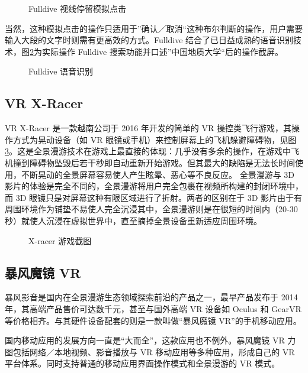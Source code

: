 \begin{figure}[htp]
\centering
{}
\caption{Fulldive 视线停留模拟点击}
\label{fig:fulldive3}
\end{figure}

当然，这种模拟点击的操作只适用于”确认／取消“这种布尔判断的操作，用户需要输入大段的文字时则需有更高效的方式。Fulldive 结合了已日益成熟的语音识别技术，图\ref{fig:fulldive4}为实际操作 Fulldive 搜索功能并口述”中国地质大学“后的操作截屏。

\begin{figure}[htp]
\centering
{}
\caption{Fulldive 语音识别}
\label{fig:fulldive4}
\end{figure}

\subsection{VR X-Racer}

VR X-Racer 是一款越南公司于 2016 年开发的简单的 VR 操控类飞行游戏，其操作方式为晃动设备（如 VR 眼镜或手机）来控制屏幕上的飞机躲避障碍物，见图\ref{fig:x-racer}。这是全景漫游技术在游戏上最直接的体现：几乎没有多余的操作，在游戏中飞机撞到障碍物坠毁后若干秒即自动重新开始游戏。但其最大的缺陷是无法长时间使用，不断晃动的全景屏幕容易使人产生眩晕、恶心等不良反应。
全景漫游与 3D 影片的体验是完全不同的，全景漫游将用户完全包裹在视频所构建的封闭环境中，而 3D 眼镜只是对屏幕这种有限区域进行了折射。两者的区别在于 3D 影片由于有周围环境作为铺垫不易使人完全沉浸其中，全景漫游则是在很短的时间内（20-30 秒）就使人沉浸在虚拟世界中，直至摘掉全景设备重新适应周围环境。

\begin{figure}[htp]
\centering
{}
\caption{X-racer 游戏截图}
\label{fig:x-racer}
\end{figure}

\subsection{暴风魔镜 VR}

暴风影音是国内在全景漫游生态领域探索前沿的产品之一，最早产品发布于 2014 年，其高端产品售价可达数千元，甚至与国外高端 VR 设备如 Oculus 和 GearVR 等价格相齐。与其硬件设备配套的则是一款叫做“暴风魔镜 VR”的手机移动应用。

国内移动应用的发展方向一直是“大而全”，这款应用也不例外。暴风魔镜 VR 力图包括网络／本地视频、影音播放与 VR 移动应用等多种应用，形成自己的 VR 平台体系。同时支持普通的移动应用界面操作模式和全景漫游的 VR 模式。

